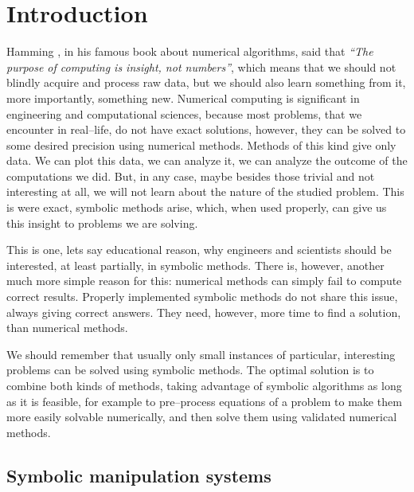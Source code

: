 
\chapter{Introduction}\label{thesis-introduction}

Hamming \cite{Hamming1987numerical}, in his famous book about numerical algorithms, said that
\emph{``The purpose of computing is insight, not numbers''}, which means that we should not blindly
acquire and process raw data, but we should also learn something from it, more importantly,
something new. Numerical computing is significant in engineering and computational sciences,
because most problems, that we encounter in real--life, do not have exact solutions, however,
they can be solved to some desired precision using numerical methods. Methods of this kind
give only data. We can plot this data, we can analyze it, we can analyze the outcome of the
computations we did. But, in any case, maybe besides those trivial and not interesting at all,
we will not learn about the nature of the studied problem. This is were exact, symbolic methods
arise, which, when used properly, can give us this insight to problems we are solving.

This is one, lets say educational reason, why engineers and scientists should be interested,
at least partially, in symbolic methods. There is, however, another much more simple reason
for this: numerical methods can simply fail to compute correct results. Properly implemented
symbolic methods do not share this issue, always giving correct answers. They need, however,
more time to find a solution, than numerical methods.

We should remember that usually only small instances of particular, interesting problems can
be solved using symbolic methods. The optimal solution is to combine both kinds of methods,
taking advantage of symbolic algorithms as long as it is feasible, for example to pre--process
equations of a problem to make them more easily solvable numerically, and then solve them
using validated numerical methods.


\section{Symbolic manipulation systems}

